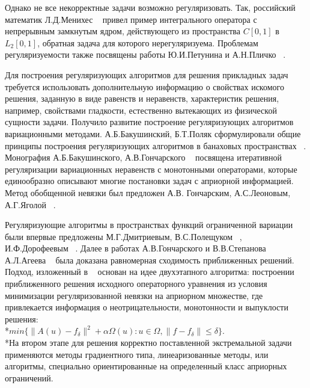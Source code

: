 \documentclass[14pt]{article}
\begin{document}
Однако не все некорректные задачи возможно регуляризовать. Так, российский математик Л.Д.Менихес ~\cite{Menih1978} привел пример интегрального оператора с непрерывным замкнутым ядром, действующего из пространства \( C[0,1] \) в \( L_2[0,1] \), обратная задача для которого нерегуляризуема. Проблемам регуляризуемости также посвящены работы Ю.И.Петунина и А.Н.Пличко ~\cite{PetPlich1980}.

Для построения регуляризующих алгоритмов для решения прикладных задач требуется использовать дополнительную информацию о свойствах искомого решения, заданную в виде равенств и неравенств, характеристик решения, например, свойствами гладкости, естественно вытекающих из физической сущности задачи. Получило развитие построение регуляризующих алгоритмов вариационными методами. А.Б.Бакушинский, Б.Т.Поляк сформулировали общие принципы построения регуляризующих алгоритмов в банаховых пространствах ~\cite{BakPol1974}. Монография А.Б.Бакушинского, А.В.Гончарского ~\cite{BakGon1989} посвящена итеративной регуляризации вариационных неравенств с монотонными операторами, которые единообразно описывают многие постановки задач с априорной информацией. Метод обобщенной невязки был предложен А.В. Гончарским, А.С.Леоновым, А.Г.Яголой ~\cite{GonLeoYag1973}.

Регуляризующие алгоритмы в пространствах функций ограниченной вариации были впервые предложены М.Г.Дмитриевым, В.С.Полещуком ~\cite{DmiPol1972}, И.Ф.Дорофеевым ~\cite{Dor1979}. Далее в работах А.В.Гончарского и В.В.Степанова ~\cite{GonSte1979} А.Л.Агеева ~\cite{Ag1980} была доказана равномерная сходимость приближенных решений. Подход, изложенный в ~\cite{TikhGonSteYag1990} основан на идее двухэтапного алгоритма: построении приближенного решения  исходного операторного уравнения из условия минимизации регуляризованной невязки на априорном множестве, где привлекается информация о неотрицательности, монотонности и выпуклости решения: \\*\begin{math} min\{\| A(u)-f_\delta\| ^2 + \alpha \Omega(u): u\in\Omega, \|f-f_\delta\|\le\delta \}.\end{math} 
\\*На втором этапе для решения корректно поставленной экстремальной задачи применяются методы градиентного типа, линеаризованные методы, или алгоритмы, специально ориентированные на определенный класс априорных ограничений.
\end{document}
